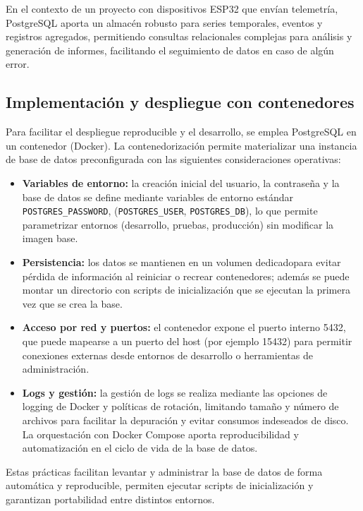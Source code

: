 \documentclass[12pt, a4paper]{article}
\begin{document}
En el contexto de un proyecto con dispositivos ESP32 que envían telemetría, PostgreSQL aporta un almacén robusto para series temporales, eventos y registros agregados, permitiendo consultas relacionales complejas para análisis y generación de informes, facilitando el seguimiento de datos en caso de algún error.

\subsection{Implementación y despliegue con contenedores}

Para facilitar el despliegue reproducible y el desarrollo, se emplea PostgreSQL en un contenedor (Docker). La contenedorización permite materializar una instancia de base de datos preconfigurada con las siguientes consideraciones operativas:

\begin{itemize}
	\item \textbf{Variables de entorno:} la creación inicial del usuario, la contraseña y la base de datos se define mediante variables de entorno estándar \texttt{POSTGRES\_PASSWORD}, (\texttt{POSTGRES\_USER}, \texttt{POSTGRES\_DB}), lo que permite parametrizar entornos (desarrollo, pruebas, producción) sin modificar la imagen base. \cite{docker_postgres}
	\item \textbf{Persistencia:} los datos se mantienen en un volumen dedicadopara evitar pérdida de información al reiniciar o recrear contenedores; además se puede montar un directorio con scripts de inicialización que se ejecutan la primera vez que se crea la base. \cite{docker_persist,docker_postgres}
	\item \textbf{Acceso por red y puertos:} el contenedor expone el puerto interno 5432, que puede mapearse a un puerto del host (por ejemplo 15432) para permitir conexiones externas desde entornos de desarrollo o herramientas de administración.
	\item \textbf{Logs y gestión:} la gestión de logs se realiza mediante las opciones de logging de Docker y políticas de rotación, limitando tamaño y número de archivos para facilitar la depuración y evitar consumos indeseados de disco. La orquestación con Docker Compose aporta reproducibilidad y automatización en el ciclo de vida de la base de datos. \cite{docker_persist}
\end{itemize}

Estas prácticas facilitan levantar y administrar la base de datos de forma automática y reproducible, permiten ejecutar scripts de inicialización y garantizan portabilidad entre distintos entornos.
\end{document}
